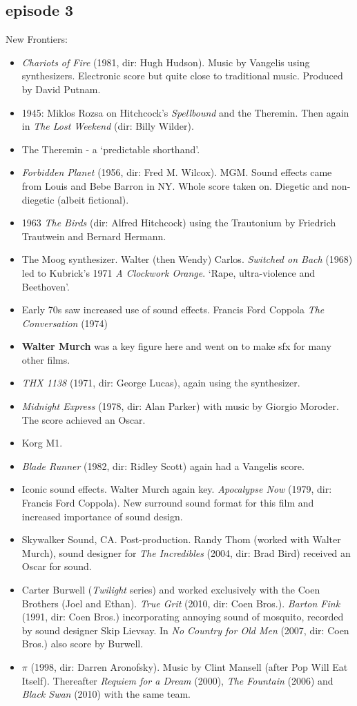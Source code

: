 \subsection{episode 3}
New Frontiers:
\begin{itemize}
\item \textit{Chariots of Fire} (1981, dir: Hugh Hudson). Music by Vangelis using synthesizers. Electronic score but quite close to traditional music. Produced by David Putnam.
\item 1945: Miklos Rozsa on Hitchcock's \textit{Spellbound} and the Theremin. Then again in \textit{The Lost Weekend} (dir: Billy Wilder). 
\item The Theremin - a `predictable shorthand'. 
\item \textit{Forbidden Planet} (1956, dir: Fred M. Wilcox). MGM. Sound effects came from Louis and Bebe Barron in NY. Whole score taken on. Diegetic and non-diegetic (albeit fictional). 
\item 1963 \textit{The Birds} (dir: Alfred Hitchcock) using the Trautonium by Friedrich Trautwein and Bernard Hermann.  
\item The Moog synthesizer. Walter (then Wendy) Carlos. \textit{Switched on Bach} (1968) led to Kubrick's 1971 \textit{A Clockwork Orange}. `Rape, ultra-violence and Beethoven'. 
\item Early 70s saw increased use of sound effects. Francis Ford Coppola \textit{The Conversation} (1974)
\item \textbf{Walter Murch} was a key figure here and went on to make sfx for many other films.
\item \textit{THX 1138} (1971, dir: George Lucas), again using the synthesizer.
\item \textit{Midnight Express} (1978, dir: Alan Parker) with music by Giorgio Moroder. The score achieved an Oscar.
\item Korg M1.
\item \textit{Blade Runner} (1982, dir: Ridley Scott) again had a Vangelis score. 
\item Iconic sound effects. Walter Murch again key. \textit{Apocalypse Now} (1979, dir: Francis Ford Coppola). New surround sound format for this film and increased importance of sound design.
\item Skywalker Sound, CA. Post-production. Randy Thom (worked with Walter Murch), sound designer for \textit{The Incredibles} (2004, dir: Brad Bird) received an Oscar for sound.    
\item Carter Burwell (\textit{Twilight} series) and worked exclusively with the Coen Brothers (Joel and Ethan). \textit{True Grit} (2010, dir: Coen Bros.). \textit{Barton Fink} (1991, dir: Coen Bros.) incorporating annoying sound of mosquito, recorded by sound designer Skip Lievsay.
In \textit{No Country for Old Men} (2007, dir: Coen Bros.) also score by Burwell. 
\item $\pi$ (1998, dir:  Darren Aronofsky). Music by Clint Mansell (after Pop Will Eat Itself). Thereafter \textit{Requiem for a Dream} (2000), \textit{The Fountain} (2006) and \textit{Black Swan} (2010) with the same team.  
\end{itemize}


